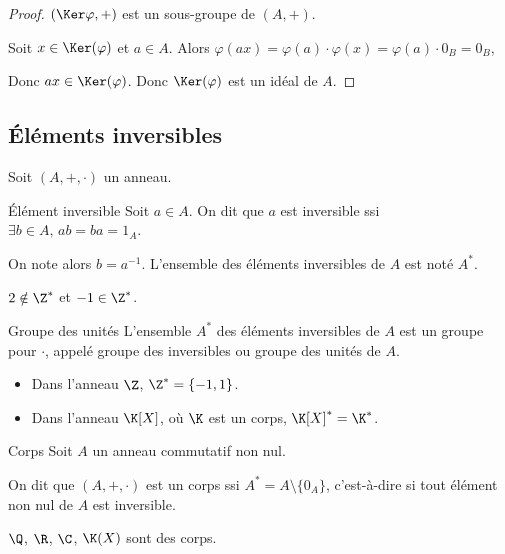 \begin{proof}
    $(\Ker \varphi, +)$ est un sous-groupe de $(A, +)$.

    Soit $x \in \Ker(\varphi)$ et $a \in A$. Alors $\varphi(ax) = \varphi(a) \cdot \varphi(x) = \varphi(a) \cdot 0_B = 0_B$,

    Donc $ax \in \Ker(\varphi)$.
    Donc $\Ker(\varphi)$ est un idéal de $A$.
\end{proof}

\subsection{Éléments inversibles}

Soit $(A, +, \cdot)$ un anneau.

\begin{definition}{Élément inversible}{}
    Soit $a \in A$. On dit que $a$ est inversible ssi $\exists b \in A, \, ab = ba = 1_A$.

    On note alors $b = a^{-1}$. L'ensemble des éléments inversibles de $A$ est noté $A^*$.
\end{definition}

\begin{exemple}
    $2 \notin \Z^*$ et $-1 \in \Z^*$.
\end{exemple}

\begin{theoreme}{Groupe des unités}{}
    L'ensemble $A^*$ des éléments inversibles de $A$ est un groupe pour $\cdot$, appelé 
    groupe des inversibles ou groupe des unités de $A$.
\end{theoreme}

\begin{exemple}
    \begin{itemize}
        \item Dans l'anneau $\Z$, $\Z^* = \{-1, 1\}$.
        \item Dans l'anneau $\K[X]$, où $\K$ est un corps, $\K[X]^* = \K^*$.
    \end{itemize}
\end{exemple}

\begin{definition}{Corps}{}
    Soit $A$ un anneau commutatif non nul. 
    
    On dit que $(A, +, \cdot)$ est un corps 
    ssi $A^* = A \setminus \{0_A\}$, c'est-à-dire si tout élément non nul de $A$ est inversible.
\end{definition}

\begin{exemple}
    $\Q$, $\R$, $\C$, $\K(X)$ sont des corps.
\end{exemple}

